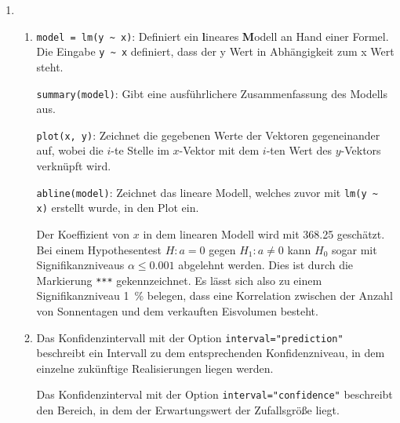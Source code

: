 \documentclass[a4paper]{scrartcl}
\def \blattnr {10}
\begin{document}
\begin{enumerate}[label=\bfseries \blattnr.\arabic*]
\begin{enumerate}
    \end{enumerate}

  \item %
    \begin{enumerate}
     \item %
    \lstinline{model = lm(y ~ x)}: Definiert ein \textbf{l}ineares
    \textbf{M}odell an Hand einer Formel. Die Eingabe \lstinline{y ~ x}
    definiert, dass der y Wert in Abhängigkeit zum x Wert steht.

    \lstinline{summary(model)}: Gibt eine ausführlichere Zusammenfassung des
    Modells aus.
	
    \lstinline{plot(x, y)}: Zeichnet die gegebenen Werte der Vektoren
    gegeneinander auf, wobei die $i$-te Stelle im $x$-Vektor mit dem $i$-ten
    Wert des $y$-Vektors verknüpft wird.
	
	\lstinline{abline(model)}: Zeichnet das lineare Modell, welches zuvor mit 
    \lstinline{lm(y ~ x)} erstellt wurde, in den Plot ein.

    Der Koeffizient von $x$ in dem linearen Modell wird mit \num{368.25}
    geschätzt. Bei einem Hypothesentest $H: a = 0$ gegen $H_1: a \neq 0$ kann
    $H_0$ sogar mit Signifikanzniveaus $\alpha \leq \num{0,001}$ abgelehnt
    werden. Dies ist durch die Markierung \texttt{***} gekennzeichnet.
    Es lässt sich also zu einem Signifikanzniveau \SI{1}{\percent} belegen,
    dass eine Korrelation zwischen der Anzahl von Sonnentagen und dem
    verkauften Eisvolumen besteht.

     \item %
         Das Konfidenzintervall mit der Option
         \lstinline{interval="prediction"} beschreibt ein Intervall zu dem
         entsprechenden Konfidenzniveau, in dem einzelne zukünftige
         Realisierungen liegen werden.

         Das Konfidenzinterval mit der Option
         \lstinline{interval="confidence"} beschreibt den Bereich, in dem der
         Erwartungswert der Zufallsgröße liegt.
         

\end{enumerate}
\end{enumerate}
\end{document}
